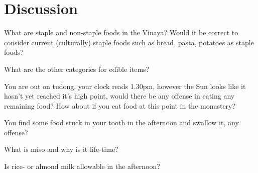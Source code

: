 \section*{Discussion}


What are staple and non-staple foods in the Vinaya?
Would it be correct to consider current (culturally) staple foods such as bread, pasta, potatoes as staple foods?


\bigskip

What are the other categories for edible items?


\bigskip

You are out on tudong, your clock reads 1.30pm, however the Sun looks like it
hasn't yet reached it's high point, would there be any offense in eating any
remaining food? How about if you eat food at this point in the monastery?


\bigskip

You find some food stuck in your tooth in the afternoon and swallow it, any offense?


\bigskip

What is miso and why is it life-time?


\bigskip

Is rice- or almond milk allowable in the afternoon?


\bigskip


